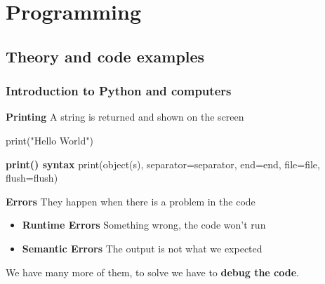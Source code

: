 \section{Programming}
\subsection{Theory and code examples}

\subsubsection{Introduction to Python and computers}

\textbf{Printing} \ra A string is returned and shown on the screen
\begin{pythoncode}
    print("Hello World")
\end{pythoncode}

\textbf{print() syntax} \ra print(object(s), separator=separator, end=end, file=file, flush=flush)

\vspace{20pt}

\textbf{Errors} \ra They happen when there is a problem in the code

\begin{itemize}
    \item \textbf{Runtime Errors} \ra Something wrong, the code won't run 
    \item \textbf{Semantic Errors} \ra The output is not what we expected
    
\end{itemize}

We have many more of them, to solve we have to \textbf{debug the code}.

\vspace{20pt}


